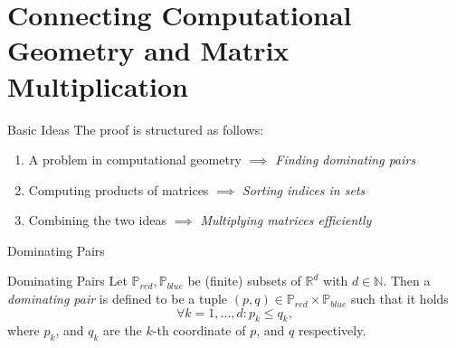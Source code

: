 \section{Connecting Computational Geometry and Matrix Multiplication}

\begin{frame}{Basic Ideas}
    The proof is structured as follows:
    \begin{enumerate}
        \item<1-> A problem in computational geometry $\implies$ \emph{Finding dominating pairs}
        \item<2-> Computing products of matrices $\implies$ \emph{Sorting indices in sets}
        \item<3-> Combining the two ideas $\implies$ \emph{Multiplying matrices efficiently}
    \end{enumerate}

    \begin{figure}
    \end{figure}
\end{frame}

\begin{frame}{Dominating Pairs}
    \begin{alertblock}{Dominating Pairs}
        Let $\mathbb{P}_{red}, \mathbb{P}_{blue}$ be (finite) subsets of $\mathbb{R}^d$ with $d \in \mathbb{N}$.
        Then a \emph{dominating pair} is defined to be a tuple $(p, q) \in \mathbb{P}_{red} \times \mathbb{P}_{blue}$ such that it holds
        \[
            \forall k = 1, \dots, d: p_k \leq q_k,
        \]
        where $p_k$, and $q_k$ are the $k$-th coordinate of $p$, and $q$ respectively.
    \end{alertblock}
\end{frame}

